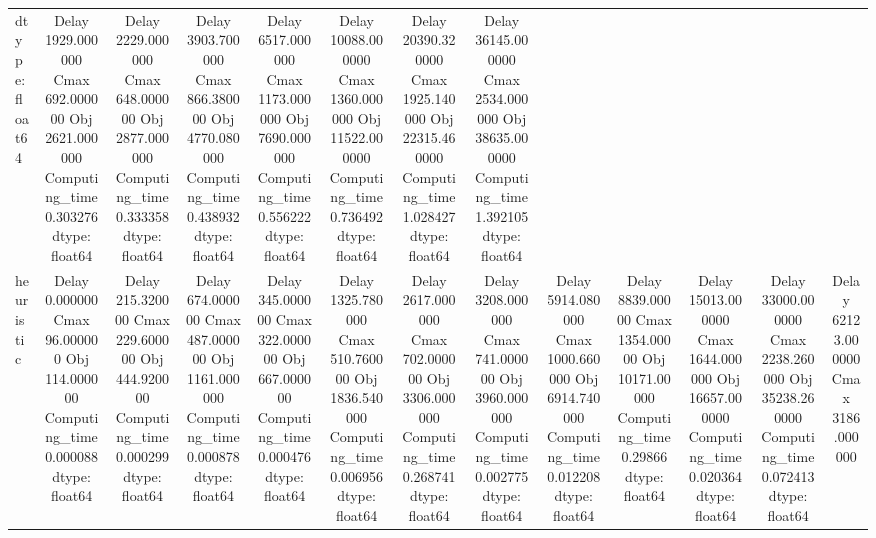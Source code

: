 \begin{tabular}{lcccccccccccc}
dtype: float64 & Delay             1929.000000
Cmax               692.000000
Obj               2621.000000
Computing_time       0.303276
dtype: float64 & Delay             2229.000000
Cmax               648.000000
Obj               2877.000000
Computing_time       0.333358
dtype: float64 & Delay             3903.700000
Cmax               866.380000
Obj               4770.080000
Computing_time       0.438932
dtype: float64 & Delay             6517.000000
Cmax              1173.000000
Obj               7690.000000
Computing_time       0.556222
dtype: float64 & Delay             10088.000000
Cmax               1360.000000
Obj               11522.000000
Computing_time        0.736492
dtype: float64 & Delay             20390.320000
Cmax               1925.140000
Obj               22315.460000
Computing_time        1.028427
dtype: float64 & Delay             36145.000000
Cmax               2534.000000
Obj               38635.000000
Computing_time        1.392105
dtype: float64 \\
heuristic & Delay               0.000000
Cmax               96.000000
Obj               114.000000
Computing_time      0.000088
dtype: float64 & Delay             215.320000
Cmax              229.600000
Obj               444.920000
Computing_time      0.000299
dtype: float64 & Delay              674.000000
Cmax               487.000000
Obj               1161.000000
Computing_time       0.000878
dtype: float64 & Delay             345.000000
Cmax              322.000000
Obj               667.000000
Computing_time      0.000476
dtype: float64 & Delay             1325.780000
Cmax               510.760000
Obj               1836.540000
Computing_time       0.006956
dtype: float64 & Delay             2617.000000
Cmax               702.000000
Obj               3306.000000
Computing_time       0.268741
dtype: float64 & Delay             3208.000000
Cmax               741.000000
Obj               3960.000000
Computing_time       0.002775
dtype: float64 & Delay             5914.080000
Cmax              1000.660000
Obj               6914.740000
Computing_time       0.012208
dtype: float64 & Delay              8839.00000
Cmax               1354.00000
Obj               10171.00000
Computing_time        0.29866
dtype: float64 & Delay             15013.000000
Cmax               1644.000000
Obj               16657.000000
Computing_time        0.020364
dtype: float64 & Delay             33000.000000
Cmax               2238.260000
Obj               35238.260000
Computing_time        0.072413
dtype: float64 & Delay             62123.000000
Cmax               3186.000000

\end{tabular}
